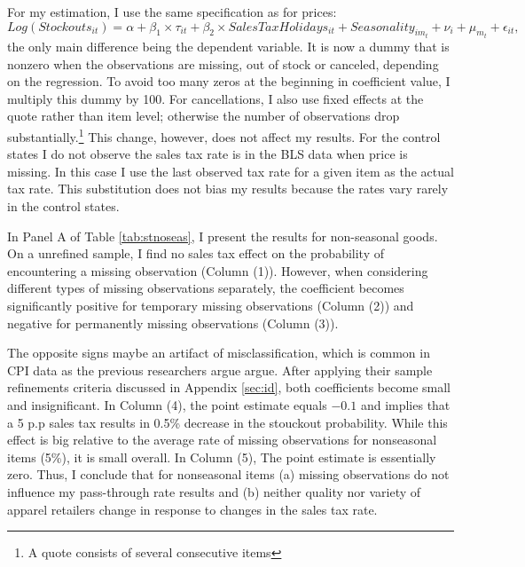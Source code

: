\documentclass[12pt]{article}
\begin{document}
	
	
	
	
	

	For my estimation, I use the same specification as for prices:
	\begin{equation}
	Log(Stockouts_{it}) = \alpha+\beta_{1}\times\tau_{it}+\beta_{2}\times SalesTaxHolidays_{it}+ Seasonality_{im_t}+\nu_{i}+\mu_{m_t}+\epsilon_{it},
	\end{equation}
	the only main difference being the dependent variable. It is now a dummy that is nonzero when the observations are missing, out of stock or canceled, depending on the regression. To avoid too many zeros at the beginning in coefficient value, I multiply this dummy by 100. For cancellations, I also use fixed effects at the quote rather than item level; otherwise the number of observations drop substantially.\footnote{A quote consists of several consecutive items} This change, however, does not affect my results. For the control states I do not observe the sales tax rate is in the BLS data when price is missing. In this case I use the last observed tax rate for a given item as the actual tax rate. This substitution does not bias my results because the rates vary rarely in the control states. 
	
	In Panel A of Table \ref{tab:stnoseas}, I present the results for non-seasonal goods. On a unrefined sample, I find no sales tax effect on the probability of encountering a missing observation (Column (1)). However, when considering different types of missing observations separately, the coefficient becomes significantly positive for temporary missing observations (Column (2)) and negative for permanently missing observations (Column (3)). 	
	
	The opposite signs maybe an artifact of misclassification, which is common in CPI data as the previous researchers argue \citet{bils, matsa} argue.  After applying their sample refinements criteria discussed in Appendix \ref{sec:id}, both coefficients become small and insignificant. In Column (4), the point estimate equals $-0.1$ and implies that a 5 p.p sales tax results in 0.5\% decrease in the stouckout probability. While this effect is big relative to the average rate of missing observations for nonseasonal items (5\%), it is small overall. In Column (5), The point estimate is essentially zero. Thus, I conclude that for nonseasonal items (a) missing observations do not influence my pass-through rate results and (b) neither quality nor variety of apparel retailers change in response to changes in the sales tax rate. 
	
\end{document}
